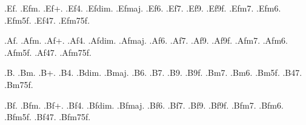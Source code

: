 %
%
.Ef.{}
.Efm.{}
.Ef+.{}
.Ef4.{}
.Efdim.{}
.Efmaj.{}
.Ef6.{}
.Ef7.{}
.Ef9.{}
.Ef9f.{}
.Efm7.{}
.Efm6.{}
.Efm5f.{}
.Ef47.{}
.Efm75f.{}

%
%
.Af.{}
.Afm.{}
.Af+.{}
.Af4.{}
.Afdim.{}
.Afmaj.{}
.Af6.{}
.Af7.{}
.Af9.{}
.Af9f.{}
.Afm7.{}
.Afm6.{}
.Afm5f.{}
.Af47.{}
.Afm75f.{}

%
%
.B.{}
.Bm.{}
.B+.{}
.B4.{}
.Bdim.{}
.Bmaj.{}
.B6.{}
.B7.{}
.B9.{}
.B9f.{}
.Bm7.{}
.Bm6.{}
.Bm5f.{}
.B47.{}
.Bm75f.{}

%
%
.Bf.{}
.Bfm.{}
.Bf+.{}
.Bf4.{}
.Bfdim.{}
.Bfmaj.{}
.Bf6.{}
.Bf7.{}
.Bf9.{}
.Bf9f.{}
.Bfm7.{}
.Bfm6.{}
.Bfm5f.{}
.Bf47.{}
.Bfm75f.{}
